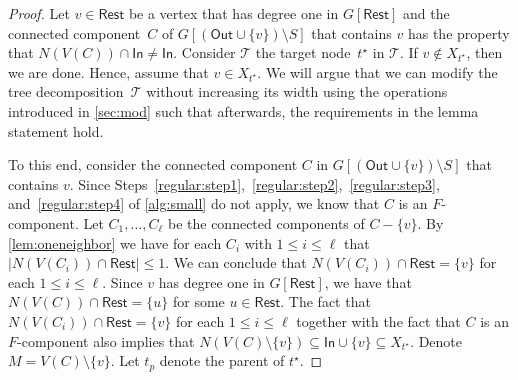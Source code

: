 \documentclass[a4paper,UKenglish,cleveref, autoref, thm-restate, numberwithinsect]{lipics-v2021}
\newcommand{\In}{\mathsf{In}}
\newcommand{\Out}{\mathsf{Out}}
\newcommand{\Rest}{\mathsf{Rest}}
\begin{document}
\begin{proof}
    Let $v\in\Rest$ be a vertex that has degree one in $G[\Rest]$ and the connected component~$C$ of $G[(\Out\cup\{v\})\setminus S]$ that contains $v$ has the property that $N(V(C))\cap \In\neq \In$. 
    Consider $\mathcal{T}$ the target node~$t^\star$ in $\mathcal{T}$.
If $v\notin X_{t^\star}$, then we are done. 
Hence, assume that $v\in X_{t^\star}$. 
We will argue that we can modify the tree decomposition~$\mathcal{T}$ without increasing its width using the operations introduced in \cref{sec:mod} such that afterwards, the requirements in the lemma statement hold.
    
    To this end, consider the connected component $C$ in $G[(\Out\cup\{v\})\setminus S]$ that contains $v$. Since Steps~\ref{regular:step1},~\ref{regular:step2},~\ref{regular:step3}, and~\ref{regular:step4} of \cref{alg:small} do not apply, we know that $C$ is an $F$-component. Let $C_1,\ldots,C_\ell$ be the connected components of $C-\{v\}$. By \cref{lem:oneneighbor} we have for each $C_i$ with $1\le i\le \ell$ that $|N(V(C_i))\cap\Rest|\le 1$. We can conclude that $N(V(C_i))\cap\Rest=\{v\}$ for each $1\le i\le \ell$. Since $v$ has degree one in $G[\Rest]$, we have that $N(V(C))\cap \Rest=\{u\}$ for some $u\in \Rest$. The fact that $N(V(C_i))\cap\Rest=\{v\}$ for each $1\le i\le \ell$ together with the fact that $C$ is an $F$-component also implies that $N(V(C)\setminus\{v\})\subseteq \In\cup\{v\}\subseteq X_{t^\star}$.   
   Denote $M=V(C)\setminus\{v\}$. Let $t_p$ denote the parent of $t^\star$. 







     



\end{proof}
\end{document}

